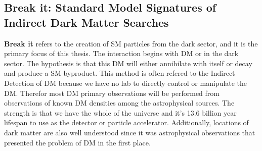 \subsection{Break it: Standard Model Signatures of Indirect Dark Matter Searches\label{sec:break_it}}

\textbf{Break it} refers to the creation of SM particles from the dark sector, and it is the primary focus of this thesis.
The interaction begins with DM or in the dark sector.
The hypothesis is that this DM will either annihilate with itself or decay and produce a SM byproduct.
This method is often refered to the Indirect Detection of DM because we have no lab to directly control or manipulate the DM.
Therefor most DM primary observations will be performed from observations of known DM densities among the astrophysical sources.
The strength is that we have the whole of the universe and it's 13.6 billion year lifespan to use as the detector or particle accelerator.
Additionally, locations of dark matter are also well understood since it was astrophysical observations that presented the problem of DM in the first place.

\begin{figure}[ht]
\end{figure}

